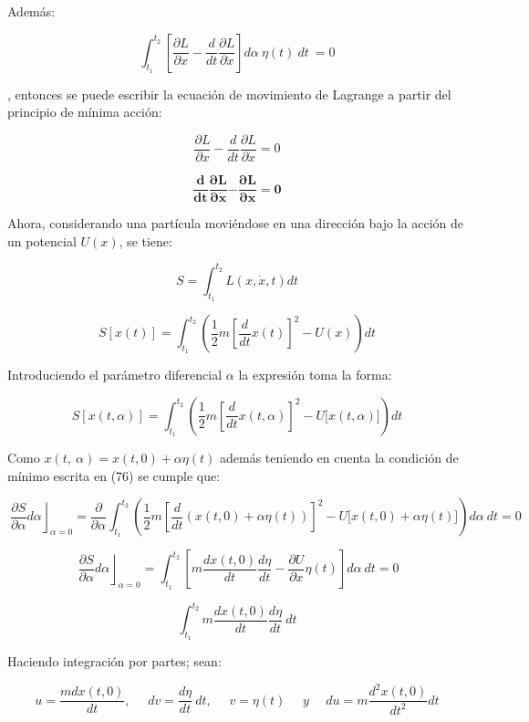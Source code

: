 \documentclass[]{article}
\begin{document}
Además:

\[\int_{t_{1}}^{t_{2}}{\left\lbrack \frac{\partial L}{\partial x} - \frac{d}{dt}\frac{\partial L}{\partial\dot{x}} \right\rbrack d\alpha\ \eta(t)\ dt\  = 0}\]

, entonces se puede escribir la ecuación de movimiento de Lagrange a
partir del principio de mínima acción:

\[\frac{\partial L}{\partial x} - \frac{d}{dt}\frac{\partial L}{\partial\dot{x}} = 0\]

\[\frac{\mathbf{d}}{\mathbf{dt}}\frac{\mathbf{\partial L}}{\mathbf{\partial}\dot{\mathbf{x}}}\mathbf{-}\frac{\mathbf{\partial L}}{\mathbf{\partial x}}\mathbf{= 0}\]

Ahora, considerando una partícula moviéndose en una dirección bajo la
acción de un potencial \(U(x)\), se tiene:

\[S = \int_{t_{1}}^{t_{2}}{L\left( x,\dot{x},t \right)dt}\]

\[S\left\lbrack x(t) \right\rbrack = \int_{t_{1}}^{t_{2}}{\left( \frac{1}{2}m\left\lbrack \frac{d}{dt}x(t) \right\rbrack^{2} - U(x) \right)dt}\]

Introduciendo el parámetro diferencial \(\alpha\) la expresión toma la
forma:

\[S\left\lbrack x(t,\alpha) \right\rbrack = \int_{t_{1}}^{t_{2}}{\left( \frac{1}{2}m\left\lbrack \frac{d}{dt}x(t,\alpha) \right\rbrack^{2} - U\lbrack x(t,\alpha)\rbrack \right)dt}\]

Como \(x(t,\ \alpha) = x(t,0) + \alpha\eta(t)\) además teniendo en
cuenta la condición de mínimo escrita en (76) se cumple que:

\[\left. \ \frac{\partial S}{\partial\alpha}d\alpha \right\rfloor_{\alpha = 0} = \frac{\partial}{\partial\alpha}\int_{t_{1}}^{t_{2}}{\left( \frac{1}{2}m\left\lbrack \frac{d}{dt}(x(t,0) + \alpha\eta(t)) \right\rbrack^{2} - U\lbrack x(t,0) + \alpha\eta(t)\rbrack \right)d\alpha\ dt} = 0\]

\[\left. \ \frac{\partial S}{\partial\alpha}d\alpha \right\rfloor_{\alpha = 0} = \int_{t_{1}}^{t_{2}}\left\lbrack m\frac{dx(t,0)}{dt}\frac{d\eta}{dt} - \frac{\partial U}{\partial x}\eta(t) \right\rbrack d\alpha\ dt = 0\]

\[\int_{t_{1}}^{t_{2}}m\frac{dx(t,0)}{dt}\frac{d\eta}{dt}\ dt\]

Haciendo integración por partes; sean:

\[u = \frac{mdx(t,0)}{dt},\ \ \ \ \ \ dv = \frac{d\eta}{dt}\ dt,\ \ \ \ \ \ v = \eta(t)\ \ \ \ \ \ y\ \ \ \ \ \ du = m\frac{d^{2}x(t,0)}{dt^{2}}dt\]
\end{document}
